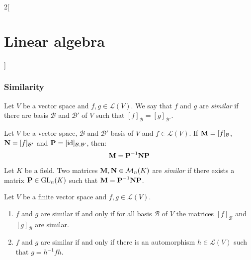 \documentclass[../../../main_math.tex]{subfiles}
\begin{document}
\begin{multicols}{2}[\section{Linear algebra}]
  \subsubsection{Similarity}
  \begin{definition}
    Let $V$ be a vector space and $f,g\in\mathcal{L}(V)$. We say that $f$ and $g$ are \emph{similar} if there are basis $\mathcal{B}$ and $\mathcal{B}'$ of $V$ such that $[f]_\mathcal{B}=[g]_{\mathcal{B}'}$.
  \end{definition}
  \begin{lemma}
    Let $V$ be a vector space, $\mathcal{B}$ and $\mathcal{B}'$ basis of $V$ and $f\in\mathcal{L}(V)$. If $\boldsymbol{\mathrm{M}}=[f]_\mathcal{B}$, $\boldsymbol{\mathrm{N}}=[f]_{\mathcal{B}'}$ and $\boldsymbol{\mathrm{P}}=[\mathrm{id}]_{\mathcal{B},\mathcal{B}'}$, then: $$\boldsymbol{\mathrm{M}}=\boldsymbol{\mathrm{P}}^{-1}\boldsymbol{\mathrm{N}}\boldsymbol{\mathrm{P}}$$
  \end{lemma}
  \begin{definition}
    Let $K$ be a field. Two matrices $\boldsymbol{\mathrm{M}}, \boldsymbol{\mathrm{N}}\in\mathcal{M}_n(K)$ are \emph{similar} if there exists a matrix $\boldsymbol{\mathrm{P}}\in\mathrm{GL}_n(K)$ such that $\boldsymbol{\mathrm{M}}=\boldsymbol{\mathrm{P}}^{-1}\boldsymbol{\mathrm{N}}\boldsymbol{\mathrm{P}}$.
  \end{definition}
  \begin{proposition}
    Let $V$ be a finite vector space and $f,g\in\mathcal{L}(V)$.
    \begin{enumerate}
      \item $f$ and $g$ are similar if and only if for all basis $\mathcal{B}$ of $V$ the matrices $[f]_\mathcal{B}$ and $[g]_\mathcal{B}$ are similar.
      \item $f$ and $g$ are similar if and only if there is an automorphism $h\in\mathcal{L}(V)$ such that $g=h^{-1}fh$.
    \end{enumerate}
  \end{proposition}

\end{multicols}
\end{document}
